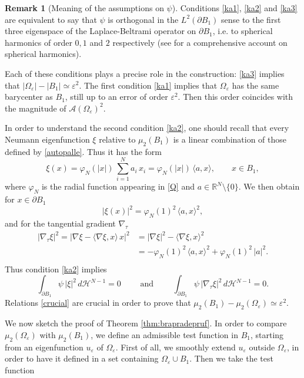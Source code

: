 \documentclass{amsart}
\theoremstyle{definition}
\newtheorem{remark}[lemma]{Remark}
\numberwithin{equation}{section}
\begin{document}
\begin{remark}[Meaning of the assumptions on $\psi$]
Conditions \eqref{ka1}, \eqref{ka2} and \eqref{ka3} are equivalent to say that $\psi$ is orthogonal in the $L^2(\partial B_1)$ sense to the first three eigenspace of the Laplace-Beltrami operator on $\partial B_1$, i.e. to spherical harmonics of order $0, 1$ and $2$ respectively (see \cite{MR1483320} for a comprehensive account on spherical harmonics).
\par
Each of these conditions plays a precise role in the construction: \eqref{ka3} implies that $|\Omega_\varepsilon|-|B_1|\simeq\varepsilon^2$. The first condition \eqref{ka1} implies that $\Omega_\varepsilon$ has the same barycenter as $B_1$, still up to an error of order $\varepsilon^2$. Then this order coincides with the magnitude of $\mathcal{A}(\Omega_\varepsilon)^2$. 
\par
In order to understand the second condition \eqref{ka2}, one should recall that every Neumann eigenfunction $\xi$ relative to $\mu_2(B_1)$ is a linear combination of those defined by \eqref{autopalle}. Thus it has the form
\[
\xi(x)=\varphi_N(|x|)\,\sum_{i=1}^N a_i\,x_i=\varphi_N(|x|)\,\langle a,x\rangle,\qquad x\in B_1,
\]
where $\varphi_N$ is the radial function appearing in \eqref{Q} and $a\in\mathbb{R}^N\setminus\{0\}$. We then obtain for $x\in\partial B_1$
\[
|\xi(x)|^2=\varphi_N(1)^2\,\langle a,x\rangle^2,
\]
and for the tangential gradient $\nabla_\tau$
\[
\begin{split}
|\nabla_\tau \xi|^2=|\nabla \xi-\langle \nabla \xi,x\rangle\,x|^2&=|\nabla \xi|^2-\langle \nabla\xi,x\rangle^2\\
&=-\varphi_N(1)^2\,\langle a,x\rangle^2+\varphi_N(1)^2\,|a|^2.\\
\end{split}
\]
Thus condition \eqref{ka2} implies
\begin{equation}
\label{crucial}
\int_{\partial B_1} \psi\, |\xi|^2\, d\mathcal{H}^{N-1}=0\qquad \mbox{ and } \qquad \int_{\partial B_1} \psi\, |\nabla_\tau \xi|^2\, d\mathcal{H}^{N-1}=0.
\end{equation}
Relations \eqref{crucial} are crucial in order to prove that $\mu_2(B_1)-\mu_2(\Omega_\varepsilon)\simeq\varepsilon^2$.
\end{remark}
We now sketch the proof of Theorem \ref{thm:brapradepruf}. In order to compare $\mu_2(\Omega_\varepsilon)$ with $\mu_2(B_1)$, we define an admissible test function in $B_1$, starting from an eigenfunction $u_\varepsilon$ of $\Omega_\varepsilon$. First of all, we smoothly extend $u_\varepsilon$ outside $\Omega_\varepsilon$, in order to have it defined in a set containing $\Omega_\varepsilon\cup B_1$. Then we take the test function
\end{document}
